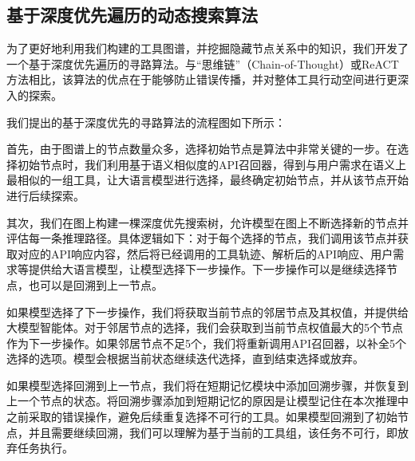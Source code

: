 \subsection{基于深度优先遍历的动态搜索算法}

为了更好地利用我们构建的工具图谱，并挖掘隐藏节点关系中的知识，我们开发了一个基于深度优先遍历的寻路算法。与“思维链”（Chain-of-Thought）或ReACT方法相比，该算法的优点在于能够防止错误传播，并对整体工具行动空间进行更深入的探索。

我们提出的基于深度优先的寻路算法的流程图如下所示：

首先，由于图谱上的节点数量众多，选择初始节点是算法中非常关键的一步。在选择初始节点时，我们利用基于语义相似度的API召回器，得到与用户需求在语义上最相似的一组工具，让大语言模型进行选择，最终确定初始节点，并从该节点开始进行后续探索。

其次，我们在图上构建一棵深度优先搜索树，允许模型在图上不断选择新的节点并评估每一条推理路径。具体逻辑如下：对于每个选择的节点，我们调用该节点并获取对应的API响应内容，然后将已经调用的工具轨迹、解析后的API响应、用户需求等提供给大语言模型，让模型选择下一步操作。下一步操作可以是继续选择节点，也可以是回溯到上一节点。

如果模型选择了下一步操作，我们将获取当前节点的邻居节点及其权值，并提供给大模型智能体。对于邻居节点的选择，我们会获取到当前节点权值最大的5个节点作为下一步操作。如果邻居节点不足5个，我们将重新调用API召回器，以补全5个选择的选项。模型会根据当前状态继续迭代选择，直到结束选择或放弃。

如果模型选择回溯到上一节点，我们将在短期记忆模块中添加回溯步骤，并恢复到上一个节点的状态。将回溯步骤添加到短期记忆的原因是让模型记住在本次推理中之前采取的错误操作，避免后续重复选择不可行的工具。如果模型回溯到了初始节点，并且需要继续回溯，我们可以理解为基于当前的工具组，该任务不可行，即放弃任务执行。


